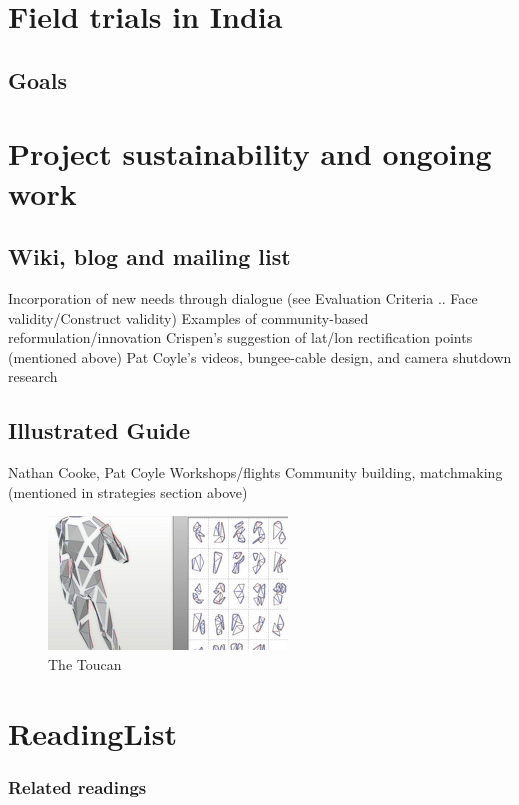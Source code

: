 \documentclass[11pt]{report}
\begin{document}
\chapter{Field trials in India}
\section{Goals}

\chapter{Project sustainability and ongoing work}
\section{Wiki, blog and mailing list}
        Incorporation of new needs through dialogue (see Evaluation Criteria .. Face validity/Construct validity)
        Examples of community-based reformulation/innovation
            Crispen's suggestion of lat/lon rectification points (mentioned above)
            Pat Coyle's videos, bungee-cable design, and camera shutdown research

\section{Illustrated Guide}
        Nathan Cooke, Pat Coyle
    Workshops/flights
    Community building, matchmaking (mentioned in strategies section above)



\begin{figure}[h]
  \begin{center}
    \includegraphics[scale=0.75]{images/test.jpg}
    \caption{The Toucan}
  \end{center}
\end{figure}

\chapter{ReadingList}

\hypertarget{related_readings_1}{}\subsection*{{Related readings}}\label{related_readings_1}
\end{document}
